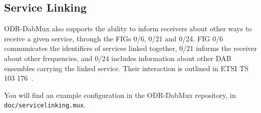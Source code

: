 \subsection{Service Linking}
ODR-DabMux also supports the ability to inform receivers about other ways to
receive a given service, through the FIGs 0/6, 0/21 and 0/24. FIG 0/6
communicates the identifiers of services linked together, 0/21 informs the
receiver about other frequencies, and 0/24 includes information about other DAB
ensembles carrying the linked service.
Their interaction is outlined in ETSI TS 103 176~\cite{etsits103176}.

You will find an example configuration in the ODR-DabMux repository, in
\texttt{doc/servicelinking.mux}.

